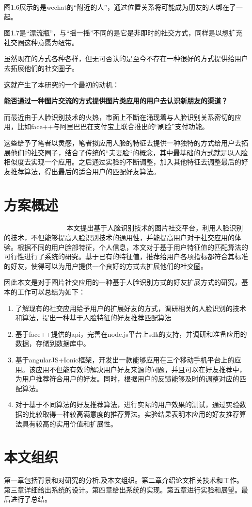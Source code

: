 图1.6展示的是wechat的“附近的人”，通过位置关系将可能成为朋友的人绑在了一起。

图1.7是“漂流瓶”，与“摇一摇”不同的是它是非即时的社交方式，同样是以想扩充社交圈这种意愿为纽带。

虽然现在的方式各种各样，但无可否认的是至今不存在一种很好的方式提供给用户去拓展他们的社交圈子。

这就产生了本研究的一个最初的动机：

 \textbf{能否通过一种图片交流的方式提供图片类应用的用户去认识新朋友的渠道？}

而最近由于人脸识别技术的火热，市面上不断在涌现着与人脸识别关系密切的应用，比如face++与阿里巴巴在支付宝上联合推出的“刷脸”支付功能。

这些给予了笔者以灵感，笔者拟应用人脸的特征去提供一种独特的方式给用户去拓展他们的社交圈子，结合了传统的“夫妻脸“的概念，其中最基础的方式就是以人脸相似度去实现一个应用。之后通过实验的不断调整，加入其他特征去调整最后的好友推荐算法，得出最后的适合用户的匹配好友算法。
\section{方案概述}
􏰉􏴳􏰭􏴴􏴵􏴶􏴷􏰿􏴸􏴹􏴘􏰏􏲦􏲜􏱲􏴺􏰭􏴻􏲆􏴻􏴼􏰏􏱦􏴷􏱜􏰒􏴽􏳯􏴾􏴿􏵀􏱾􏱜本文提出基于人脸识别技术的图片社交平台，利用人脸识别的技术，不但能够提高人脸识别技术的通用性，并能提高用户对于社交应用的体验。根据不同的用户脸部特征，个人信息，本文对于基于用户特征值的匹配算法的可行性进行了系统的研究。基于已有的特征值，推荐给用户各项指标都符合其标准的好友，使得可以为用户提供一个良好的方式去扩展他们的社交圈。


因此本文是对于图片社交应用的一种基于人脸识别方式的好友扩展方式的研究，基本的工作可以总结为如下：
\begin{enumerate}
\item 了解现有的社交应用给予用户的扩展好友的方式，调研相关的人脸识别的技术和算法，提出一种基于人脸特征的好友推荐匹配算法
\item 基于face++提供的api，完善在node.js平台上sdk的支持，并调研和准备应用的数据，存储到数据库中。
\item 基于angularJS+Ionic框架，开发出一款能够应用在三个移动手机平台上的应用。该应用不但能有效的解决用户好友来源的问题，并且可以在好友推荐中，为用户推荐符合用户的好友。同时，根据用户的反馈能够及时的调整对应的匹配算法。
\item 对于基于不同算法的好友推荐算法，进行实际的用户效果的测试，通过实验数据的比较取得一种较高满意度的推荐算法。实验结果表明本应用的好友推荐算法具有较高的实用价值和扩展性。
\end{enumerate}

\section{本文组织}
第一章包括背景和对研究的分析,及本文组织。第二章介绍论文相关技术和工作。第三章详细给出系统的设计。第四章给出系统的实现。第五章进行实验和展望。最后进行了总结。


